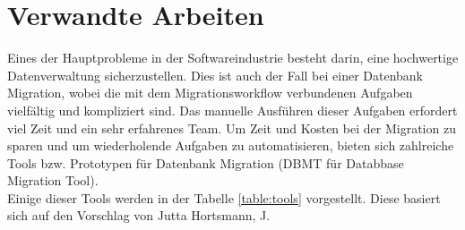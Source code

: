 \section{Verwandte Arbeiten}
Eines der Hauptprobleme in der Softwareindustrie besteht darin, eine hochwertige Datenverwaltung sicherzustellen. Dies ist auch der Fall bei einer Datenbank Migration, wobei die mit dem Migrationsworkflow verbundenen Aufgaben vielfältig und kompliziert sind. Das manuelle Ausführen dieser Aufgaben erfordert viel Zeit und ein sehr erfahrenes Team. Um Zeit und Kosten bei der Migration zu sparen und um wiederholende Aufgaben zu automatisieren, bieten sich zahlreiche Tools bzw. Prototypen für Datenbank Migration (DBMT für Databbase Migration Tool). \\
Einige dieser Tools werden in der Tabelle \ref{table:tools} vorgestellt. Diese basiert sich auf den Vorschlag von Jutta Hortsmann, J.

